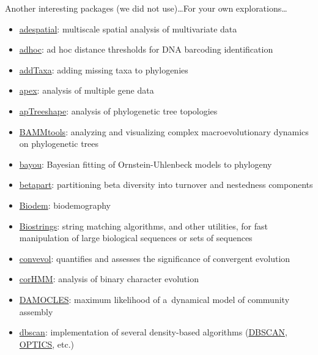 \documentclass[compress, ucs, xelatex, 11pt, xcolor=svgnames, aspectratio=169,
	hyperref={
		bookmarks=true,
		unicode=true,
		colorlinks=true,
		pdftitle={Molecular data in R},
		plainpages=false,
		pdfauthor={Vojtech Zeisek},
		pdfsubject={Course about phylogeny and evolution in R},
		pdfcreator={XeLaTeX},
		pdfkeywords={R, evolution, phylogeny, molecular data},
		linkcolor=Crimson, %
		anchorcolor=Magenta, %
		citecolor=Magenta, %
		filecolor=Magenta, %
		menucolor=Magenta, %
		urlcolor=DodgerBlue, %
		pdftex},
	url={hyphens, lowtilde} %
	]{beamer}
\begin{document}
\begin{frame}[allowframebreaks]{Another interesting packages (we did not use)\ldots}{For your own explorations\ldots}
	\begin{itemize}
		\item \href{https://CRAN.R-project.org/package=adespatial}{adespatial}: multiscale spatial analysis of multivariate data
		\item \href{https://CRAN.R-project.org/package=adhoc}{adhoc}: ad hoc distance thresholds for DNA barcoding identification
		\item \href{https://github.com/eliotmiller/addTaxa}{addTaxa}: adding missing taxa to phylogenies
		\item \href{https://CRAN.R-project.org/package=apex}{apex}: analysis of multiple gene data
		\item \href{https://CRAN.R-project.org/package=apTreeshape}{apTreeshape}: analysis of phylogenetic tree topologies
		\item \href{https://CRAN.R-project.org/package=BAMMtools}{BAMMtools}: analyzing and visualizing complex macroevolutionary dynamics on phylogenetic trees
		\item \href{https://CRAN.R-project.org/package=bayou}{bayou}: Bayesian fitting of Ornstein-Uhlenbeck models to phylogeny
		\item \href{https://CRAN.R-project.org/package=betapart}{betapart}: partitioning beta diversity into turnover and nestedness components
		\item \href{https://CRAN.R-project.org/package=Biodem}{Biodem}: biodemography
		\item \href{https://www.bioconductor.org/packages/release/bioc/html/Biostrings.html}{Biostrings}: string matching algorithms, and other utilities, for fast manipulation of large biological sequences or sets of sequences
		\item \href{https://CRAN.R-project.org/package=convevol}{convevol}: quantifies and assesses the significance of convergent evolution
		\item \href{https://CRAN.R-project.org/package=corHMM}{corHMM}: analysis of binary character evolution
		\item \href{https://CRAN.R-project.org/package=DAMOCLES}{DAMOCLES}: maximum likelihood of a~dynamical model of community assembly
		\item \href{https://CRAN.R-project.org/package=dbscan}{dbscan}: implementation of several density-based algorithms (\href{https://en.wikipedia.org/wiki/DBSCAN}{DBSCAN}, \href{https://en.wikipedia.org/wiki/OPTICS_algorithm}{OPTICS}, etc.)

\end{itemize}
\end{frame}
\end{document}
